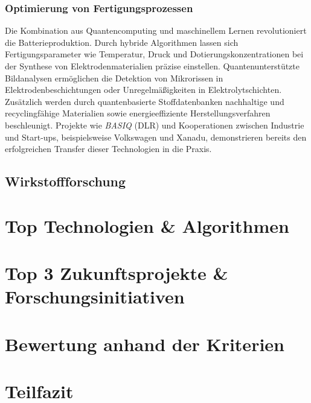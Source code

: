 \subsubsection*{Optimierung von Fertigungsprozessen}

Die Kombination aus Quantencomputing und maschinellem Lernen revolutioniert die Batterieproduktion. Durch hybride Algorithmen lassen sich Fertigungsparameter wie Temperatur, Druck und Dotierungskonzentrationen bei der Synthese von Elektrodenmaterialien präzise einstellen. Quantenunterstützte Bildanalysen ermöglichen die Detektion von Mikrorissen in Elektrodenbeschichtungen oder Unregelmäßigkeiten in Elektrolytschichten. Zusätzlich werden durch quantenbasierte Stoffdatenbanken nachhaltige und recyclingfähige Materialien sowie energieeffiziente Herstellungsverfahren beschleunigt. Projekte wie \textit{BASIQ} (DLR) und Kooperationen zwischen Industrie und Start-ups, beispielsweise Volkswagen und Xanadu, demonstrieren bereits den erfolgreichen Transfer dieser Technologien in die Praxis.

\subsection{Wirkstoffforschung}

\section{Top Technologien \& Algorithmen}
\section{Top 3 Zukunftsprojekte \& Forschungsinitiativen}
\section{Bewertung anhand der Kriterien}
\section{Teilfazit}


\printbibliography
